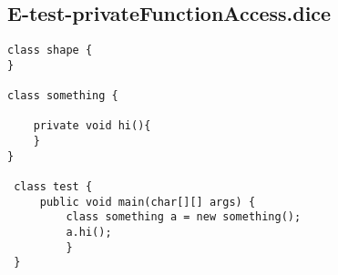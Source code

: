 \subsection{E-test-privateFunctionAccess.dice}
\begin{verbatim}
class shape {
}

class something {
	
	private void hi(){
	}
}

 class test {
	 public void main(char[][] args) {
		 class something a = new something();
		 a.hi();		 
		 }
 }
\end{verbatim}